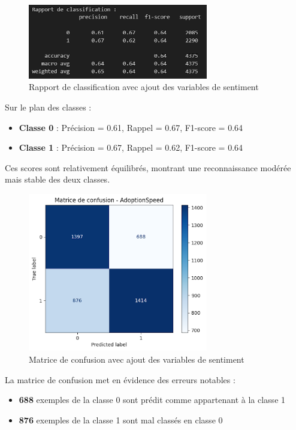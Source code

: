 \documentclass[a4paper,12pt]{article}
\begin{document}
\begin{figure}[H]
    \centering
    \includegraphics[width=0.7\textwidth]{image-rapport-classification.png}
    \caption{Rapport de classification avec ajout des variables de sentiment}
    \label{fig:rapport_sentiment}
\end{figure}

Sur le plan des classes :
\begin{itemize}
    \item \textbf{Classe 0} : Précision = 0.61, Rappel = 0.67, F1-score = 0.64
    \item \textbf{Classe 1} : Précision = 0.67, Rappel = 0.62, F1-score = 0.64
\end{itemize}

Ces scores sont relativement équilibrés, montrant une reconnaissance modérée mais stable des deux classes.

\begin{figure}[H]
    \centering
    \includegraphics[width=0.7\textwidth]{image-matrice-confusion.png}
    \caption{Matrice de confusion avec ajout des variables de sentiment}
    \label{fig:matrice_sentiment}
\end{figure}

La matrice de confusion met en évidence des erreurs notables :
\begin{itemize}
    \item \textbf{688} exemples de la classe 0 sont prédit comme appartenant à la classe 1
    \item \textbf{876} exemples de la classe 1 sont mal classés en classe 0
\end{itemize}
\end{document}
